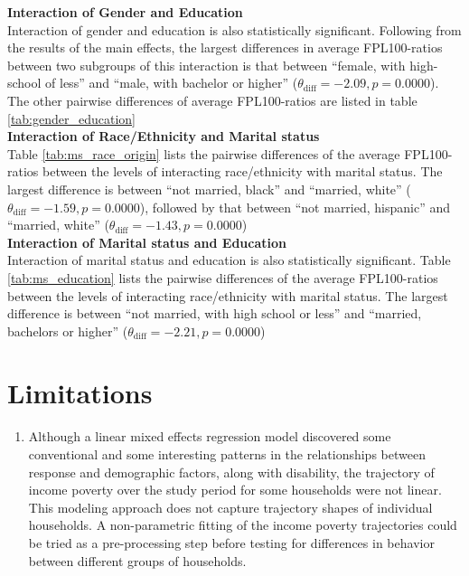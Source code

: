 \documentclass[11pt]{extarticle} %
\begin{document}
\noindent
{\bf{Interaction of Gender and Education}} \\
Interaction of gender and education is also statistically significant. Following from the results of the main effects, the largest differences in average FPL100-ratios between two subgroups of this interaction is that between ``female, with high-school of less'' and ``male, with bachelor or higher'' ($\theta_{\text{diff}} = -2.09, p = 0.0000 $). The other pairwise differences of average FPL100-ratios are listed in table \ref{tab:gender_education}\\
\noindent
{\bf{Interaction of Race/Ethnicity and Marital status}} \\
Table \ref{tab:ms_race_origin} lists the pairwise differences of the average FPL100-ratios between the levels of interacting race/ethnicity with marital status. The largest difference is between ``not married, black'' and ``married, white'' ($\theta_{\text{diff}} = -1.59, p = 0.0000 $), followed by that between ``not married, hispanic'' and ``married, white'' ($\theta_{\text{diff}} = -1.43, p = 0.0000 $) \\
\noindent
{\bf{Interaction of Marital status and Education}} \\
Interaction of marital status and education is also statistically significant. Table \ref{tab:ms_education} lists the pairwise differences of the average FPL100-ratios between the levels of interacting race/ethnicity with marital status. The largest difference is between ``not married, with high school or less'' and ``married, bachelors or higher'' ($\theta_{\text{diff}} = -2.21, p = 0.0000 $)\\


\section{Limitations}
\begin{enumerate}
\item Although a linear mixed effects regression model discovered some conventional and some interesting patterns in the relationships between response and demographic factors, along with disability, the trajectory of income poverty over the study period for some households were not linear. This modeling approach does not capture trajectory shapes of individual households. A non-parametric fitting of the income poverty trajectories could be tried as a pre-processing step before testing for differences in behavior between different groups of households. 
\end{enumerate}

\newpage




\newpage

\end{document}
